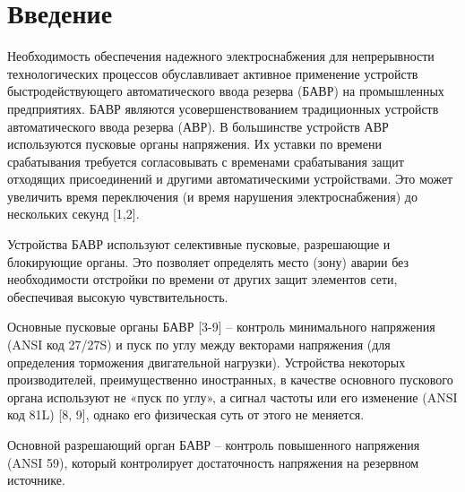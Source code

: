 
\section{Введение}\label{sec:ch1_intro}

Необходимость обеспечения надежного электроснабжения для непрерывности технологических процессов обуславливает активное применение устройств быстродействующего автоматического ввода резерва (БАВР) на промышленных предприятиях. БАВР являются усовершенствованием традиционных устройств автоматического ввода резерва (АВР). В большинстве устройств АВР используются пусковые органы напряжения. Их уставки по времени срабатывания требуется согласовывать с временами срабатывания защит отходящих присоединений и другими автоматическими устройствами. Это может увеличить время переключения (и время нарушения электроснабжения) до нескольких секунд [1,2].\par\vspace{0.2cm}

Устройства БАВР используют селективные пусковые, разрешающие и блокирующие органы. Это позволяет определять место (зону) аварии без необходимости отстройки по времени от других защит элементов сети, обеспечивая высокую чувствительность.\par\vspace{0.2cm}

Основные пусковые органы БАВР [3-9] – контроль минимального напряжения (ANSI код 27/27S) и пуск по углу между векторами напряжения (для определения торможения двигательной нагрузки). Устройства некоторых производителей, преимущественно иностранных, в качестве основного пускового органа используют не «пуск по углу», а сигнал частоты или его изменение (ANSI код 81L) [8, 9], однако его физическая суть от этого не меняется.\par\vspace{0.2cm}

Основной разрешающий орган БАВР – контроль повышенного напряжения (ANSI 59), который контролирует достаточность напряжения на резервном источнике.\par\vspace{0.2cm}


